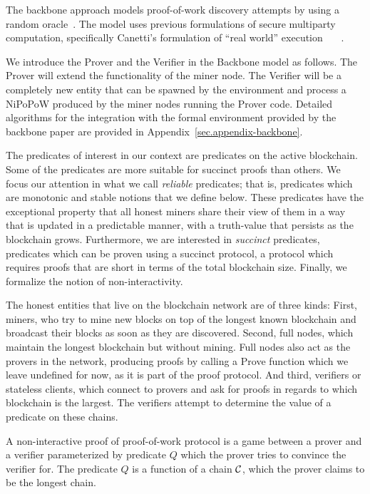 The backbone approach models proof-of-work discovery attempts by using a random
oracle~\cite{RO}. The model uses previous formulations of secure multiparty
computation, specifically Canetti's formulation of ``real world'' execution
~\cite{uc0}~\cite{uc1}~\cite{uc2}.

We introduce the Prover and the Verifier in
the Backbone model as follows. The Prover will extend the functionality
of the miner node. The Verifier will be a completely new entity that can be spawned
by the environment and process a NiPoPoW produced by the miner nodes running
the Prover code. Detailed algorithms for the integration with the formal
environment provided by the backbone paper are provided in
Appendix~\ref{sec.appendix-backbone}.

The predicates of interest in our context are predicates on the active
blockchain. Some of the predicates are more suitable for succinct proofs than
others. We focus our attention in what we call \textit{reliable} predicates;
that is, predicates which are monotonic and stable notions that we define below.
These predicates have the exceptional property that all honest miners share
their view of them in a way that is updated in a predictable manner, with a
truth-value that persists as the blockchain grows.  Furthermore, we are
interested in \textit{succinct} predicates, predicates which can be proven using
a succinct protocol, a protocol which requires proofs that are short in terms of
the total blockchain size. Finally, we formalize the notion of non-interactivity.

The honest entities that live on the blockchain network are of three kinds:
First, miners, who try to mine new blocks on top of the longest known blockchain
and broadcast their blocks as soon as they are discovered. Second, full nodes,
which maintain the longest blockchain but without mining. Full nodes also act as
the provers in the network, producing proofs by calling a Prove function which
we leave undefined for now, as it is part of the proof protocol. And third,
verifiers or stateless clients, which connect to provers and ask for proofs in
regards to which blockchain is the largest. The verifiers attempt to determine the value of a predicate on these chains.

A non-interactive proof of proof-of-work protocol is a game between a prover
and a verifier parameterized by predicate $Q$ which the prover tries to
convince the verifier for. The predicate $Q$ is a function of a chain $\mathcal{C}$,
which the prover claims to be the longest chain.

